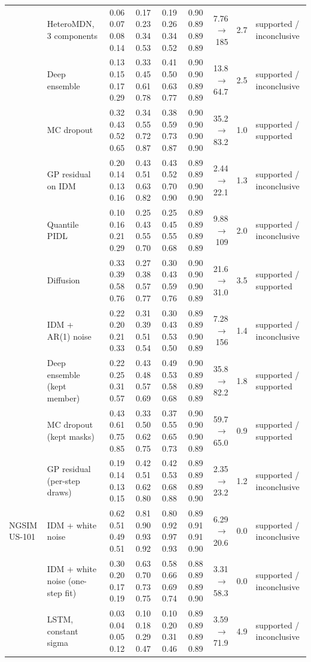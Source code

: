 \begin{longtable}{llrrrrrrl}
 & HeteroMDN, 3 components & 0.06 0.07 0.08 0.14 & 0.17 0.23 0.34 0.53 & 0.19 0.26 0.34 0.52 & 0.90 0.89 0.89 0.89 & 7.76 $\rightarrow$ 185 & 2.7 & supported / inconclusive \\
 & Deep ensemble & 0.13 0.15 0.17 0.29 & 0.33 0.45 0.61 0.78 & 0.41 0.50 0.63 0.77 & 0.90 0.90 0.89 0.89 & 13.8 $\rightarrow$ 64.7 & 2.5 & supported / inconclusive \\
 & MC dropout & 0.32 0.43 0.52 0.65 & 0.34 0.55 0.72 0.87 & 0.38 0.59 0.73 0.87 & 0.90 0.90 0.90 0.90 & 35.2 $\rightarrow$ 83.2 & 1.0 & supported / supported \\
 & GP residual on IDM & 0.20 0.14 0.13 0.16 & 0.43 0.51 0.63 0.82 & 0.43 0.52 0.70 0.90 & 0.89 0.89 0.90 0.90 & 2.44 $\rightarrow$ 22.1 & 1.3 & supported / inconclusive \\
 & Quantile PIDL & 0.10 0.16 0.21 0.29 & 0.25 0.43 0.55 0.70 & 0.25 0.45 0.55 0.68 & 0.89 0.89 0.89 0.89 & 9.88 $\rightarrow$ 109 & 2.0 & supported / inconclusive \\
 & Diffusion & 0.33 0.39 0.58 0.76 & 0.27 0.38 0.57 0.77 & 0.30 0.43 0.59 0.76 & 0.90 0.90 0.90 0.89 & 21.6 $\rightarrow$ 31.0 & 3.5 & supported / supported \\
 & IDM + AR(1) noise & 0.22 0.20 0.21 0.33 & 0.31 0.39 0.51 0.54 & 0.30 0.43 0.53 0.50 & 0.89 0.89 0.90 0.89 & 7.28 $\rightarrow$ 156 & 1.4 & supported / inconclusive \\
 & Deep ensemble (kept member) & 0.22 0.25 0.31 0.57 & 0.43 0.48 0.57 0.69 & 0.49 0.53 0.58 0.68 & 0.90 0.89 0.89 0.89 & 35.8 $\rightarrow$ 82.2 & 1.8 & supported / supported \\
 & MC dropout (kept masks) & 0.43 0.61 0.75 0.85 & 0.33 0.50 0.62 0.75 & 0.37 0.55 0.65 0.73 & 0.90 0.90 0.90 0.89 & 59.7 $\rightarrow$ 65.0 & 0.9 & supported / supported \\
 & GP residual (per-step draws) & 0.19 0.14 0.13 0.15 & 0.42 0.51 0.62 0.80 & 0.42 0.53 0.68 0.88 & 0.89 0.89 0.89 0.90 & 2.35 $\rightarrow$ 23.2 & 1.2 & supported / inconclusive \\
\midrule
NGSIM US-101 & IDM + white noise & 0.62 0.51 0.49 0.51 & 0.81 0.90 0.93 0.92 & 0.80 0.92 0.97 0.93 & 0.89 0.91 0.91 0.90 & 6.29 $\rightarrow$ 20.6 & 0.0 & supported / inconclusive \\
 & IDM + white noise (one-step fit) & 0.30 0.20 0.17 0.19 & 0.63 0.70 0.73 0.75 & 0.58 0.66 0.69 0.74 & 0.88 0.89 0.89 0.90 & 3.31 $\rightarrow$ 58.3 & 0.0 & supported / inconclusive \\
 & LSTM, constant sigma & 0.03 0.04 0.05 0.12 & 0.10 0.18 0.29 0.47 & 0.10 0.20 0.31 0.46 & 0.89 0.89 0.89 0.89 & 3.59 $\rightarrow$ 71.9 & 4.9 & supported / inconclusive \\

\end{longtable}

